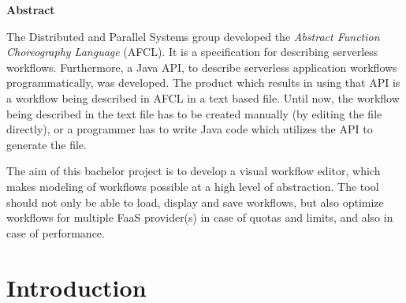 \documentclass[a4paper,top=25mm,bottom=25mm,12pt,pdftex,halfparskip,twoside,bibtotoc,numbers=noenddot]{scrbook}
\begin{document}


\clearpage



\clearpage

\thispagestyle{plain}

\vspace{2.5cm}
\begin{center}
\textbf{Abstract}
\end{center}


The Distributed and Parallel Systems group developed the \emph{Abstract Function Choreography Language} (AFCL). It is a specification for describing serverless workflows. Furthermore, a Java API, to describe serverless application workflows programmatically, was developed.
The product which results in using that API is a workflow being described in AFCL in a text based file.
Until now, the workflow being described in the text file has to be created manually (by editing the file directly), or a programmer has to write Java code which utilizes the API to generate the file.
\par
The aim of this bachelor project is to develop a visual workflow editor, which makes modeling of workflows possible at a high level of abstraction. The tool should not only be able to load, display and save workflows, but also optimize workflows for multiple FaaS provider(s) in case of quotas and limits, and also in case of performance.

\tableofcontents

\listoffigures

\listoftables

\mainmatter
\pagestyle{fancy}

\renewcommand{\chaptermark}[1]{%
	\markboth{\thechapter.\ #1}{}
}

\fancyhead{}
\fancyhead[LO]{\leftmark}
\fancyhead[RE]{\rightmark}
\fancyfoot{}
\fancyfoot[LO,RE]{\thepage}

\label{chap:introduction}
\chapter{Introduction}


\end{document}
